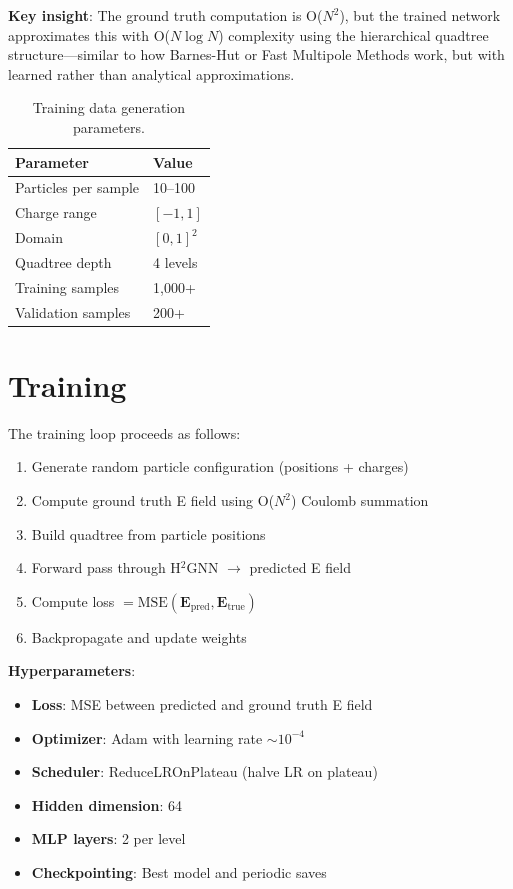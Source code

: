 \documentclass[11pt,a4paper]{article}
\begin{document}
\textbf{Key insight}: The ground truth computation is O($N^2$), but the trained network approximates this with O($N \log N$) complexity using the hierarchical quadtree structure---similar to how Barnes-Hut or Fast Multipole Methods work, but with learned rather than analytical approximations.

\begin{table}[H]
\centering
\begin{tabular}{ll}
\toprule
Parameter & Value \\
\midrule
Particles per sample & 10--100 \\
Charge range & $[-1, 1]$ \\
Domain & $[0, 1]^2$ \\
Quadtree depth & 4 levels \\
Training samples & 1,000+ \\
Validation samples & 200+ \\
\bottomrule
\end{tabular}
\caption{Training data generation parameters.}
\label{tab:data_params}
\end{table}

\section{Training}

The training loop proceeds as follows:

\begin{enumerate}
    \item Generate random particle configuration (positions + charges)
    \item Compute ground truth E field using O($N^2$) Coulomb summation
    \item Build quadtree from particle positions
    \item Forward pass through H$^2$GNN $\to$ predicted E field
    \item Compute loss $= \text{MSE}(\mathbf{E}_{\text{pred}}, \mathbf{E}_{\text{true}})$
    \item Backpropagate and update weights
\end{enumerate}

\textbf{Hyperparameters}:
\begin{itemize}
    \item \textbf{Loss}: MSE between predicted and ground truth E field
    \item \textbf{Optimizer}: Adam with learning rate $\sim 10^{-4}$
    \item \textbf{Scheduler}: ReduceLROnPlateau (halve LR on plateau)
    \item \textbf{Hidden dimension}: 64
    \item \textbf{MLP layers}: 2 per level
    \item \textbf{Checkpointing}: Best model and periodic saves
\end{itemize}
\end{document}
